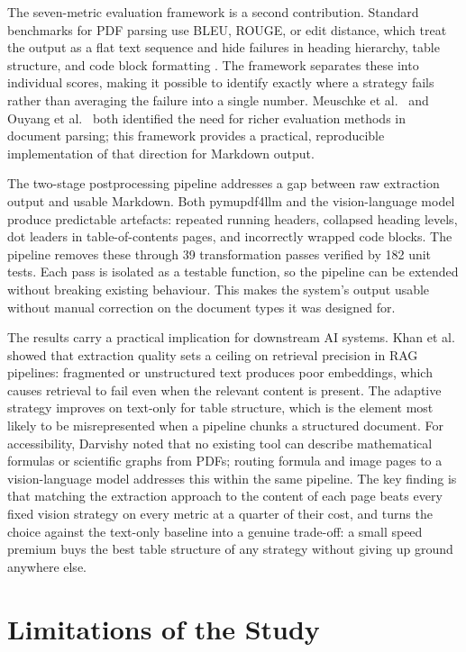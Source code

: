 The seven-metric evaluation framework is a second contribution. Standard
benchmarks for PDF parsing use BLEU, ROUGE, or edit distance, which treat the
output as a flat text sequence and hide failures in heading hierarchy, table
structure, and code block formatting \autocite{papineni2002}. The framework
separates these into individual scores, making it possible to identify exactly
where a strategy fails rather than averaging the failure into a single number.
Meuschke et al.\ \autocite{meuschke2023} and Ouyang et al.\
\autocite{omnidocbench2025} both identified the need for richer evaluation methods
in document parsing; this framework provides a practical, reproducible
implementation of that direction for Markdown output.

The two-stage postprocessing pipeline addresses a gap between raw extraction
output and usable Markdown. Both pymupdf4llm and the vision-language model produce
predictable artefacts: repeated running headers, collapsed heading levels, dot
leaders in table-of-contents pages, and incorrectly wrapped code blocks. The
pipeline removes these through 39 transformation passes verified by 182 unit
tests. Each pass is isolated as a testable function, so the pipeline can be
extended without breaking existing behaviour. This makes the system's output
usable without manual correction on the document types it was designed for.

The results carry a practical implication for downstream AI systems. Khan et al.\
\autocite{khan2024} showed that extraction quality sets a ceiling on retrieval
precision in RAG pipelines: fragmented or unstructured text produces poor
embeddings, which causes retrieval to fail even when the relevant content is
present. The adaptive strategy improves on text-only for table structure, which
is the element most likely to be misrepresented when a pipeline chunks a
structured document. For accessibility, Darvishy \autocite{darvishy2018} noted
that no existing tool can describe mathematical formulas or scientific graphs from
PDFs; routing formula and image pages to a vision-language model addresses this
within the same pipeline. The key finding is that matching the extraction approach
to the content of each page beats every fixed vision strategy on every metric
at a quarter of their cost, and turns the choice against the text-only
baseline into a genuine trade-off: a small speed premium buys the best table
structure of any strategy without giving up ground anywhere else.

\section{Limitations of the Study}

